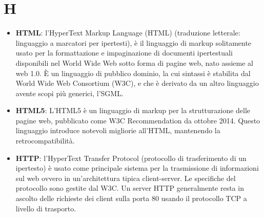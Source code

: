 \section{H}
\begin{itemize} 
	\item
	\textbf{HTML}: l'HyperText Markup Language (HTML) (traduzione letterale: linguaggio a marcatori per ipertesti), è il linguaggio di markup solitamente usato per la formattazione e impaginazione di documenti ipertestuali disponibili nel World Wide Web sotto forma di pagine web, nato assieme al web 1.0.
	È un linguaggio di pubblico dominio, la cui sintassi è stabilita dal World Wide Web Consortium (W3C), e che è derivato da un altro linguaggio avente scopi più generici, l'SGML. 
	\item
	\textbf{HTML5}: L'HTML5 è un linguaggio di markup per la strutturazione delle pagine web, pubblicato come W3C Recommendation da ottobre 2014. Questo linguaggio introduce notevoli migliorie all'HTML, 
	mantenendo la retrocompatibilità.
	\item
	\textbf{HTTP}: l'HyperText Transfer Protocol (protocollo di trasferimento di un ipertesto) è usato come principale sistema per la trasmissione di informazioni sul web ovvero in un'architettura tipica client-server. Le specifiche del protocollo sono gestite dal W3C. Un server HTTP generalmente resta in ascolto delle richieste dei client sulla porta 80 usando il protocollo TCP a livello di trasporto.
\end{itemize}
